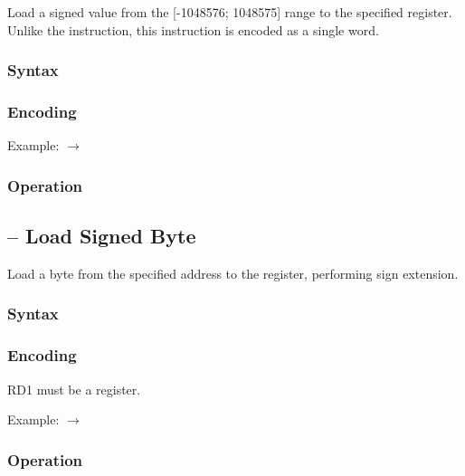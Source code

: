 \documentclass[a4paper,12pt,twoside,extrafontsizes]{memoir}
\begin{document}
{Load a signed value from the [-1048576; 1048575] range to the specified register. Unlike the  instruction, this instruction is encoded as a single word.

\subsubsection{Syntax}


\subsubsection{Encoding}


Example:  $\rightarrow$ 

\subsubsection{Operation}


\subsection{ -- Load Signed Byte}
\label{subsec:instr:lsb}

Load a byte from the specified address to the register, performing sign extension.

\subsubsection{Syntax}


\subsubsection{Encoding}


RD1 must be a register.

Example:  $\rightarrow$ 

\subsubsection{Operation}

}
\end{document}
